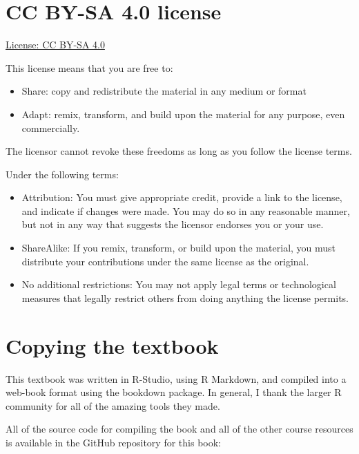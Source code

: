 \documentclass[
  oneside,
  12pt]{crumpbook}
\providecommand{\tightlist}{%
  \setlength{\itemsep}{0pt}\setlength{\parskip}{0pt}}
\begin{document}
\hypertarget{cc-by-sa-4.0-license}{%
\section{CC BY-SA 4.0 license}\label{cc-by-sa-4.0-license}}

\href{https://creativecommons.org/licenses/by-sa/4.0/}{License: CC BY-SA 4.0}

This license means that you are free to:

\begin{itemize}
\tightlist
\item
  Share: copy and redistribute the material in any medium or format
\item
  Adapt: remix, transform, and build upon the material for any purpose, even commercially.
\end{itemize}

The licensor cannot revoke these freedoms as long as you follow the license terms.

Under the following terms:

\begin{itemize}
\tightlist
\item
  Attribution: You must give appropriate credit, provide a link to the license, and indicate if changes were made. You may do so in any reasonable manner, but not in any way that suggests the licensor endorses you or your use.
\item
  ShareAlike: If you remix, transform, or build upon the material, you must distribute your contributions under the same license as the original.
\item
  No additional restrictions: You may not apply legal terms or technological measures that legally restrict others from doing anything the license permits.
\end{itemize}

\hypertarget{copying-the-textbook}{%
\section{Copying the textbook}\label{copying-the-textbook}}

This textbook was written in R-Studio, using R Markdown, and compiled into a web-book format using the bookdown package. In general, I thank the larger R community for all of the amazing tools they made.

All of the source code for compiling the book and all of the other course resources is available in the GitHub repository for this book:
\end{document}
